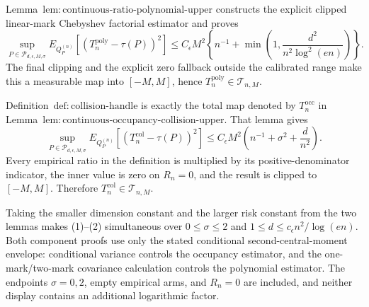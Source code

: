 Lemma~\(\mathrm{lem:continuous\text{-}ratio\text{-}polynomial\text{-}upper}\) constructs the explicit clipped linear-mark Chebyshev factorial estimator and proves
\[
 \sup_{P\in\mathcal P_{d,\epsilon,M,\sigma}}
 E_{Q_P^{(n)}}[(T_n^{\mathrm{poly}}-\tau(P))^2]
 \le C_{\epsilon}M^2\left\{n^{-1}+\min\left(1,
 \frac{d^2}{n^2\log^2(en)}\right)\right\}.
\tag{1}
\]
The final clipping and the explicit zero fallback outside the calibrated range make this a measurable map into \([-M,M]\), hence \(T_n^{\mathrm{poly}}\in\mathcal T_{n,M}\).

Definition~\(\mathrm{def:collision\text{-}handle}\) is exactly the total map denoted by \(T_n^{\mathrm{occ}}\) in Lemma~\(\mathrm{lem:continuous\text{-}occupancy\text{-}collision\text{-}upper}\).  That lemma gives
\[
 \sup_{P\in\mathcal P_{d,\epsilon,M,\sigma}}
 E_{Q_P^{(n)}}[(T_n^{\mathrm{col}}-\tau(P))^2]
 \le C_{\epsilon}M^2\left(n^{-1}+\sigma^2+\frac d{n^2}\right).
\tag{2}
\]
Every empirical ratio in the definition is multiplied by its positive-denominator indicator, the inner value is zero on \(R_n=0\), and the result is clipped to \([-M,M]\).  Therefore \(T_n^{\mathrm{col}}\in\mathcal T_{n,M}\).

Taking the smaller dimension constant and the larger risk constant from the two lemmas makes (1)--(2) simultaneous over \(0\le\sigma\le2\) and \(1\le d\le c_\epsilon n^2/\log(en)\).  Both component proofs use only the stated conditional second-central-moment envelope: conditional variance controls the occupancy estimator, and the one-mark/two-mark covariance calculation controls the polynomial estimator.  The endpoints \(\sigma=0,2\), empty empirical arms, and \(R_n=0\) are included, and neither display contains an additional logarithmic factor.